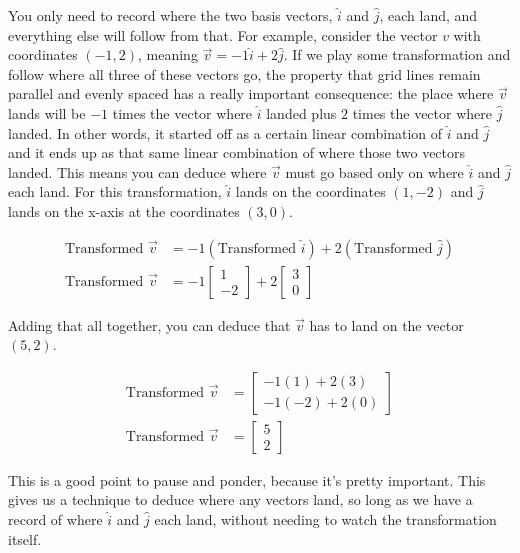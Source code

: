 You only need to record where the two basis vectors, $\hat{i}$ and $\hat{j}$,
each land, and everything else will follow from that. For example, consider the
vector $v$ with coordinates $(-1, 2)$, meaning $\vec{v} = -1\hat{i} + 2\hat{j}$.
If we play some transformation and follow where all three of these vectors go,
the property that grid lines remain parallel and evenly spaced has a really
important consequence: the place where $\vec{v}$ lands will be $-1$ times the
vector where $\hat{i}$ landed plus $2$ times the vector where $\hat{j}$ landed.
In other words, it started off as a certain linear combination of $\hat{i}$ and
$\hat{j}$ and it ends up as that same linear combination of where those two
vectors landed. This means you can deduce where $\vec{v}$ must go based only on
where $\hat{i}$ and $\hat{j}$ each land. For this transformation, $\hat{i}$
lands on the coordinates $(1, -2)$ and $\hat{j}$ lands on the x-axis at the
coordinates $(3, 0)$.

\begin{align*}
  \text{Transformed } \vec{v} &= -1(\text{Transformed } \hat{i}) +
    2(\text{Transformed } \hat{j}) \\
  \text{Transformed } \vec{v} &= -1\begin{bmatrix}
    1 \\
    -2
  \end{bmatrix} + 2\begin{bmatrix}
    3 \\
    0
  \end{bmatrix}
\end{align*}

Adding that all together, you can deduce that $\vec{v}$ has to land on the
vector $(5, 2)$.

\begin{align*}
  \text{Transformed } \vec{v} &= \begin{bmatrix}
    -1(1) + 2(3) \\
    -1(-2) + 2(0)
  \end{bmatrix} \\
  \text{Transformed } \vec{v} &= \begin{bmatrix}
    5 \\
    2
  \end{bmatrix}
\end{align*}

This is a good point to pause and ponder, because it's pretty important. This
gives us a technique to deduce where any vectors land, so long as we have a
record of where $\hat{i}$ and $\hat{j}$ each land, without needing to watch the
transformation itself.

